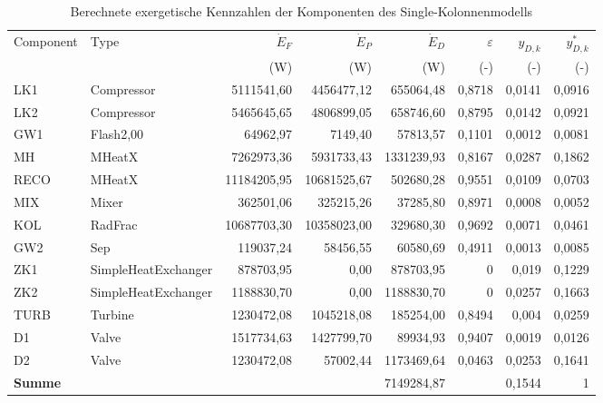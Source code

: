 \begin{longtable}{llrrrrrr}
\caption{Berechnete exergetische Kennzahlen der Komponenten des Single-Kolonnenmodells} \\
\hline
Component & Type & $\dot{E}_F$ & $\dot{E}_P$ & $\dot{E}_D$ & $\varepsilon$ & $y_{D,k}$ & $y^*_{D,k}$  \\
 &  & (W) & (W) & (W) & (-) & (-) & (-)  \\
\hline
LK1 & Compressor & 5111541,60 & 4456477,12 & 655064,48 & 0,8718 & 0,0141 & 0,0916 \\
LK2 & Compressor & 5465645,65 & 4806899,05 & 658746,60 & 0,8795 & 0,0142 & 0,0921 \\
GW1 & Flash2,00 & 64962,97 & 7149,40 & 57813,57 & 0,1101 & 0,0012 & 0,0081 \\
MH & MHeatX & 7262973,36 & 5931733,43 & 1331239,93 & 0,8167 & 0,0287 & 0,1862 \\
RECO & MHeatX & 11184205,95 & 10681525,67 & 502680,28 & 0,9551 & 0,0109 & 0,0703 \\
MIX & Mixer & 362501,06 & 325215,26 & 37285,80 & 0,8971 & 0,0008 & 0,0052 \\
KOL & RadFrac & 10687703,30 & 10358023,00 & 329680,30 & 0,9692 & 0,0071 & 0,0461 \\
GW2 & Sep & 119037,24 & 58456,55 & 60580,69 & 0,4911 & 0,0013 & 0,0085 \\
ZK1 & SimpleHeatExchanger & 878703,95 & 0,00 & 878703,95 & 0 & 0,019 & 0,1229 \\
ZK2 & SimpleHeatExchanger & 1188830,70 & 0,00 & 1188830,70 & 0 & 0,0257 & 0,1663 \\
TURB & Turbine & 1230472,08 & 1045218,08 & 185254,00 & 0,8494 & 0,004 & 0,0259 \\
D1 & Valve & 1517734,63 & 1427799,70 & 89934,93 & 0,9407 & 0,0019 & 0,0126 \\
D2 & Valve & 1230472,08 & 57002,44 & 1173469,64 & 0,0463 & 0,0253 & 0,1641 \\
\hline
\textbf{Summe} & &  &  & 7149284,87 &  & 0,1544 & 1 \\
\hline
\end{longtable}
